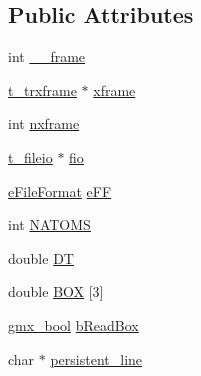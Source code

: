 \subsection*{\-Public \-Attributes}
\begin{DoxyCompactItemize}
\item 
int \hyperlink{structt__trxstatus_ae4bd66cd09c4b71ff54653fc305dc745}{\-\_\-\-\_\-frame}
\item 
\hyperlink{include_2types_2trx_8h_a206f77137d72a5db1097a457a7144ad5}{t\-\_\-trxframe} $\ast$ \hyperlink{structt__trxstatus_af8640393cc528042718edeb61dd1a8fb}{xframe}
\item 
int \hyperlink{structt__trxstatus_a0b42d115b748bfe58920afcec963da85}{nxframe}
\item 
\hyperlink{structt__fileio}{t\-\_\-fileio} $\ast$ \hyperlink{structt__trxstatus_a94e797a6b7dfbc41168dccc41d711a15}{fio}
\item 
\hyperlink{trxio_8c_a56925a30efae695d773560094d9b957a}{e\-File\-Format} \hyperlink{structt__trxstatus_a2a29b836b272e0aa597616cee24877a6}{e\-F\-F}
\item 
int \hyperlink{structt__trxstatus_ab9dc26263c83e04bc3af3f977844110d}{\-N\-A\-T\-O\-M\-S}
\item 
double \hyperlink{structt__trxstatus_a7bef365f68bd0314b0018b27b588c040}{\-D\-T}
\item 
double \hyperlink{structt__trxstatus_aca3cc62fa45499ab0a7474cb183ed6a1}{\-B\-O\-X} \mbox{[}3\mbox{]}
\item 
\hyperlink{include_2types_2simple_8h_a8fddad319f226e856400d190198d5151}{gmx\-\_\-bool} \hyperlink{structt__trxstatus_a09c6fd6b908a4041937d85ceaf429410}{b\-Read\-Box}
\item 
char $\ast$ \hyperlink{structt__trxstatus_abce784fd934379f79ad78a48c8bdb8c3}{persistent\-\_\-line}
\end{DoxyCompactItemize}


